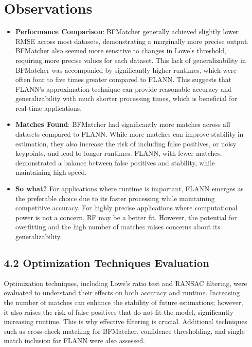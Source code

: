 \section*{Observations}
\begin{itemize}
    \item \textbf{Performance Comparison}: BFMatcher generally achieved slightly lower RMSE across most datasets, demonstrating a marginally more precise output. BFMatcher also seemed more sensitive to changes in Lowe's threshold, requiring more precise values for each dataset. This lack of generalizability in BFMatcher was accompanied by significantly higher runtimes, which were often four to five times greater compared to FLANN. This suggests that FLANN's approximation technique can provide reasonable accuracy and generalizability with much shorter processing times, which is beneficial for real-time applications.
    
    \item \textbf{Matches Found}: BFMatcher had significantly more matches across all datasets compared to FLANN. While more matches can improve stability in estimation, they also increase the risk of including false positives, or noisy keypoints, and lead to longer runtimes. FLANN, with fewer matches, demonstrated a balance between false positives and stability, while maintaining high speed.
    
    \item \textbf{So what?} For applications where runtime is important, FLANN emerges as the preferable choice due to its faster processing while maintaining competitive accuracy. For highly precise applications where computational power is not a concern, BF may be a better fit. However, the potential for overfitting and the high number of matches raises concerns about its generalizability.
\end{itemize}





\subsection*{4.2 Optimization Techniques Evaluation}

Optimization techniques, including Lowe's ratio test and RANSAC filtering, were evaluated to understand their effects on both accuracy and runtime. Increasing the number of matches can enhance the stability of future estimations; however, it also raises the risk of false positives that do not fit the model, significantly increasing runtime. This is why effective filtering is crucial. Additional techniques such as cross-check matching for BFMatcher, confidence thresholding, and single match inclusion for FLANN were also assessed.



